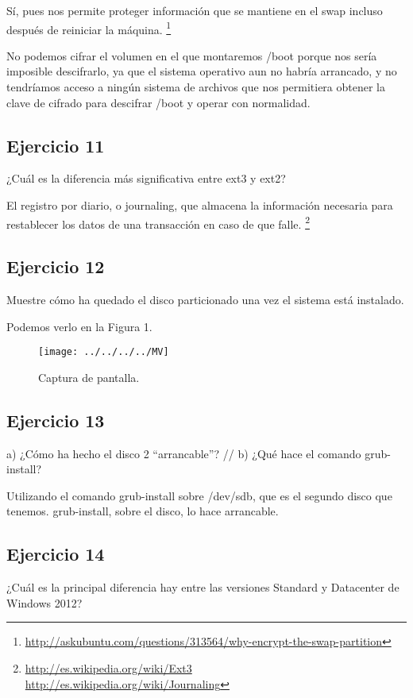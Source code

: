 \documentclass[a4paper, 11pt]{article} %
\begin{document}
Sí, pues nos permite proteger información que se mantiene en el swap incluso después de reiniciar la máquina. 
\footnote{\url{http://askubuntu.com/questions/313564/why-encrypt-the-swap-partition}}

No podemos cifrar el volumen en el que montaremos /boot porque nos sería imposible descifrarlo, ya que el sistema operativo aun no habría arrancado, y no tendríamos acceso a ningún sistema de archivos que nos permitiera obtener la clave de cifrado para descifrar /boot y operar con normalidad. 

\subsection*{Ejercicio 11}
¿Cuál es la diferencia más significativa entre ext3 y ext2?

El registro por diario, o journaling, que almacena la información necesaria para restablecer los datos de una transacción en caso de que falle. \footnote{\url{http://es.wikipedia.org/wiki/Ext3} \\ \url{http://es.wikipedia.org/wiki/Journaling}}

\pagebreak

\subsection*{Ejercicio 12}
Muestre cómo ha quedado el disco particionado una vez el sistema está
instalado.

Podemos verlo en la Figura 1. 

\begin{figure}[htpb]
\texttt{[image: ../../../../MV]}
\caption{Captura de pantalla.}
\end{figure}

\subsection*{Ejercicio 13}
a) ¿Cómo ha hecho el disco 2 “arrancable”? //
b) ¿Qué hace el comando grub-install?

Utilizando el comando grub-install sobre /dev/sdb, que es el segundo disco que tenemos. grub-install, sobre el disco, lo hace arrancable. 


\subsection*{Ejercicio 14}
¿Cuál es la principal diferencia hay entre las versiones Standard y
Datacenter de Windows 2012?
\end{document}
